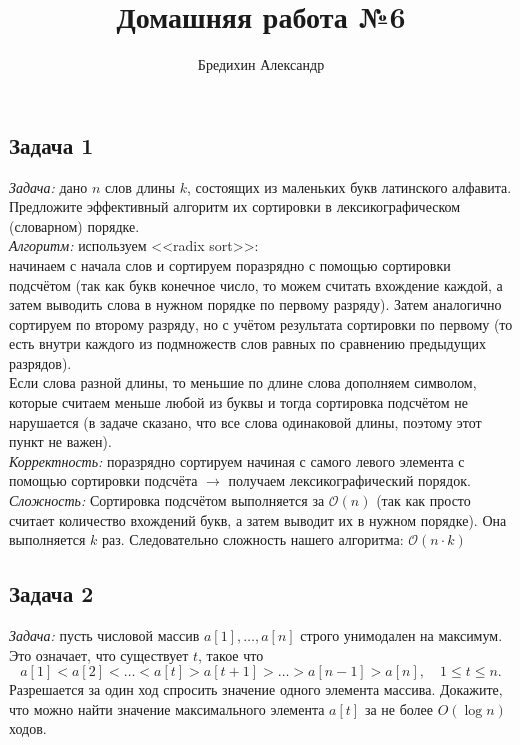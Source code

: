 \documentclass[a4paper,12pt]{article} %
\author{Бредихин Александр}
\title{Домашняя работа №6}
\begin{document}
\maketitle
\subsection*{Задача 1}
\textit{Задача:} дано $n$ слов длины $k$, состоящих из маленьких букв латинского алфавита. Предложите эффективный алгоритм их сортировки в лексикографическом (словарном) порядке.\\

\textit{Алгоритм:} используем <<radix sort>>: \\
начинаем с начала слов и сортируем поразрядно с помощью сортировки подсчётом (так как букв конечное число, то можем считать вхождение каждой, а затем выводить слова в нужном порядке по первому разряду). Затем аналогично сортируем по второму разряду, но с учётом результата сортировки по первому (то есть внутри каждого из подмножеств слов равных по сравнению предыдущих разрядов).\\
Если слова разной длины, то меньшие по длине слова дополняем символом, которые считаем меньше любой из буквы и тогда сортировка подсчётом не нарушается (в задаче сказано, что все слова одинаковой длины, поэтому этот пункт не важен).\\

\textit{Корректность:} поразрядно сортируем начиная с самого левого элемента с помощью сортировки подсчёта $ \longrightarrow $ получаем лексикографический порядок.\\

\textit{Сложность:} Сортировка подсчётом выполняется за $\mathcal{O}(n)$ (так как просто считает количество вхождений букв, а затем выводит их в нужном порядке). Она выполняется $ k $ раз. Следовательно сложность нашего алгоритма: $ \mathcal{O}(n \cdot k) $
  
  
  
\subsection*{Задача 2}
\textit{Задача:} пусть числовой массив $a[1],\dots,a[n]$ строго унимодален на максимум. Это означает, что существует $t$, такое что
$$
a[1]<a[2]<\dots< a[t]> a[t+1]>\dots> a[n-1]> a[n],
\quad 1\leq t\leq n.
$$
Разрешается за один ход спросить значение одного элемента массива.
Докажите, что можно найти значение максимального элемента $a[t]$ за
не более $O(\log n)$ ходов.\\
\end{document}
